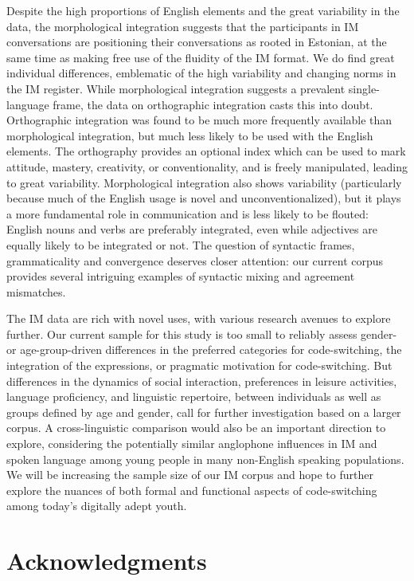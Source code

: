 \documentclass[output=paper]{langscibook}
\begin{document}
Despite the high proportions of English elements and the great variability in the data, the morphological integration suggests that the participants in IM conversations are positioning their conversations as rooted in Estonian, at the same time as making free use of the fluidity of the IM format. We do find great individual differences, emblematic of the high variability and changing norms in the IM register. While morphological integration suggests a prevalent single-language frame, the data on orthographic integration casts this into doubt. Orthographic integration was found to be much more frequently available than morphological integration, but much less likely to be used with the English elements. The orthography provides an optional index which can be used to mark attitude, mastery, creativity, or conventionality, and is freely manipulated, leading to great variability. Morphological integration also shows variability (particularly because much of the English usage is novel and unconventionalized), but it plays a more fundamental role in communication and is less likely to be flouted: English nouns and verbs are preferably integrated, even while adjectives are equally likely to be integrated or not. The question of syntactic frames, grammaticality and convergence deserves closer attention: our current corpus provides several intriguing examples of syntactic mixing and agreement mismatches.~

The IM data are rich with novel uses, with various research avenues to explore further. Our current sample for this study is too small to reliably assess gender- or age-group-driven differences in the preferred categories for code-switching, the integration of the expressions, or pragmatic motivation for code-switching. But differences in the dynamics of social interaction, preferences in leisure activities, language proficiency, and linguistic repertoire, between individuals as well as groups defined by age and gender, call for further investigation based on a larger corpus. A cross-linguistic comparison would also be an important direction to explore, considering the potentially similar anglophone influences in IM and spoken language among young people in many non-English speaking populations. We will be increasing the sample size of our IM corpus and hope to further explore the nuances of both formal and functional aspects of code-switching among today’s digitally adept youth.~

\section*{Acknowledgments}
\end{document}
